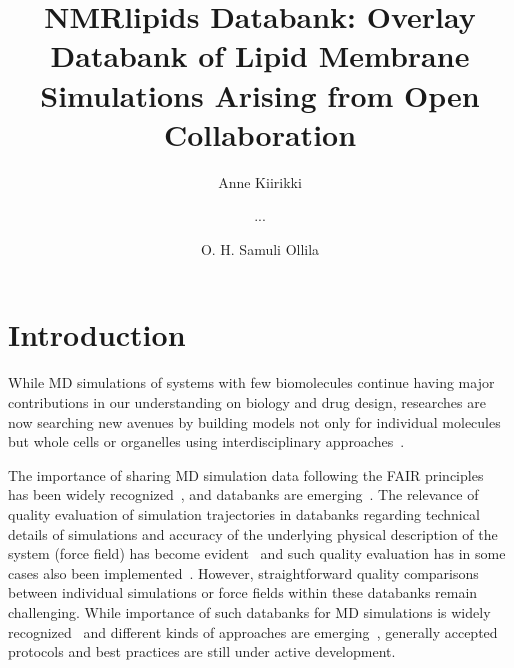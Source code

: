 \documentclass[fleqn,10pt]{wlscirep}
\title{NMRlipids Databank: Overlay Databank of Lipid Membrane Simulations Arising from Open Collaboration}
\author[1]{Anne Kiirikki}
\author[2]{...}
\author[1,*]{O. H. Samuli Ollila}
\affil[1]{University of Helsinki, Institute of Biotechonology, Helsinki, Finland}
\affil[2]{Affiliation, department, city, postcode, country}
\affil[*]{samuli.ollila@helsinki.fi}
\begin{document}
\flushbottom
\maketitle
%
%
\thispagestyle{empty}


\section{Introduction}


While MD simulations of systems with few biomolecules continue having major contributions in our understanding on biology and drug design, researches are now searching new avenues by building models not only for individual molecules but whole cells or organelles using interdisciplinary approaches~\cite{johnson15,thornburg22,gupta22}.

The importance of sharing MD simulation data following the FAIR principles~\cite{wilkinson16} has been widely recognized~\cite{feig99,tai04,silva06,abraham19,hildebrand19,hospital20,abriata20,espigares20}, and databanks are emerging~\cite{meyer10,kamp10,hospital16,mixcoha16,newport19,bekker20,espigares20,leston22}.
The relevance of quality evaluation of simulation trajectories in databanks regarding technical details of simulations and accuracy of the underlying physical description of the system (force field) has become evident~\cite{tai04,meyer10,hospital20} and such quality evaluation has in some cases also been implemented~\cite{meyer10,hospital16}. However, straightforward quality comparisons between individual simulations or force fields within these databanks remain challenging. 
While importance of such databanks for MD simulations is widely recognized~\cite{feig99,tai04,silva06,abraham19,hildebrand19,hospital20,abriata20,espigares20} and different kinds of approaches are emerging~\cite{meyer10,kamp10,hospital16,mixcoha16,newport19,bekker20,espigares20,leston22}, generally accepted protocols and best practices are still under active development.
\end{document}
